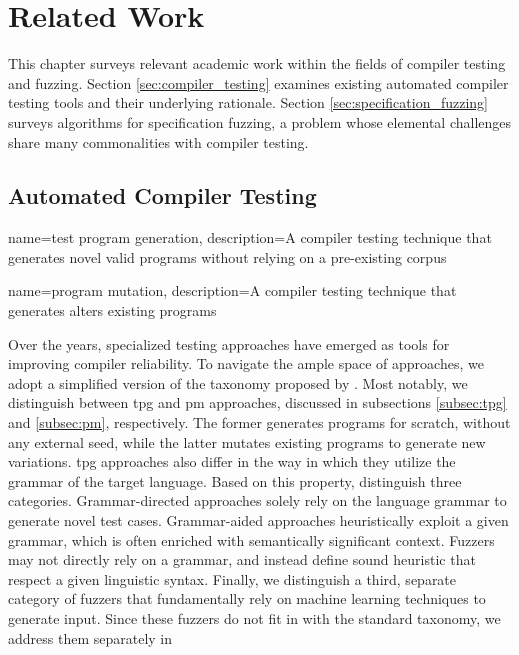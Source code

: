 \chapter{\label{cha:related}Related Work}

This chapter surveys relevant academic work within
the fields of compiler testing and fuzzing.
Section \ref{sec:compiler_testing} examines existing
automated compiler testing tools and their underlying rationale.
Section \ref{sec:specification_fuzzing} surveys algorithms
for specification fuzzing, a problem whose elemental challenges
share many commonalities with compiler testing. 

\section{\label{sec:compiler_testing}Automated Compiler Testing}

{
        name=test program generation,
        description={A compiler testing technique
        that generates novel valid programs
        without relying on a pre-existing corpus}
}

{
        name=program mutation,
        description={A compiler testing technique
        that generates alters existing programs}
}

Over the years, specialized testing approaches have emerged
as tools for improving compiler reliability.
To navigate the ample space of approaches, we adopt a simplified
version of the taxonomy proposed by \citet{chen2020survey}. 
Most notably, we distinguish between \gls{tpg} and \gls{pm} approaches, discussed
in subsections \ref{subsec:tpg} and \ref{subsec:pm}, respectively.
The former generates programs for scratch, without any
external seed, while the latter mutates existing programs to generate
new variations. 
\Gls{tpg} approaches also differ in the way in which they
utilize the grammar of the target language.
Based on this property, \citet{chen2020survey} distinguish three
categories.
Grammar-directed approaches solely rely on the
language grammar to generate novel test cases.
Grammar-aided approaches heuristically exploit a given
grammar, which is often enriched with semantically
significant context. 
Fuzzers may not directly rely on a grammar,
and instead define sound heuristic that respect
a given linguistic syntax.
Finally, we distinguish a third, separate category of fuzzers
that fundamentally rely on machine learning techniques to generate input.
Since these fuzzers do not fit in with the standard taxonomy, we address them separately in



